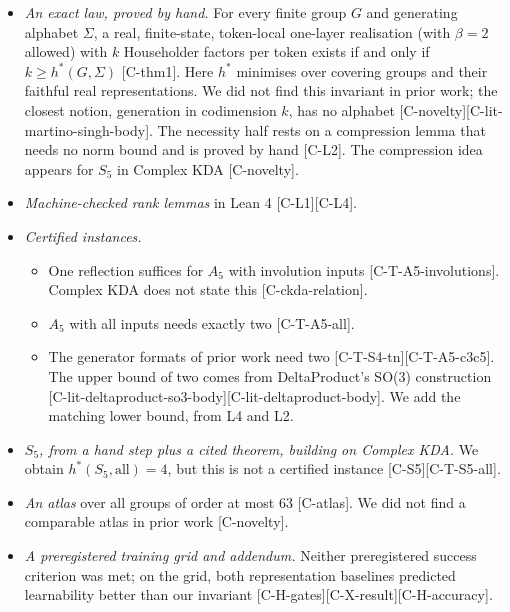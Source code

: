 \documentclass[10pt,twocolumn,a4paper]{article}
\providecommand{\tightlist}{\setlength{\itemsep}{0pt}\setlength{\parskip}{0pt}}
\begin{document}
\begin{itemize}
\tightlist
\item
  \emph{An exact law, proved by hand.} For every finite group \(G\) and generating alphabet \(\Sigma\), a real, finite-state, token-local one-layer realisation (with \(\beta = 2\) allowed) with \(k\) Householder factors per token exists if and only if \(k \ge h^*(G,\Sigma)\) {[}C-thm1{]}. Here \(h^*\) minimises over covering groups and their faithful real representations. We did not find this invariant in prior work; the closest notion, generation in codimension \(k\), has no alphabet {[}C-novelty{]}{[}C-lit-martino-singh-body{]}. The necessity half rests on a compression lemma that needs no norm bound and is proved by hand {[}C-L2{]}. The compression idea appears for \(S_5\) in Complex KDA {[}C-novelty{]}.
\item
  \emph{Machine-checked rank lemmas} in Lean 4 {[}C-L1{]}{[}C-L4{]}.
\item
  \emph{Certified instances.}

  \begin{itemize}
  \tightlist
  \item
    One reflection suffices for \(A_5\) with involution inputs {[}C-T-A5-involutions{]}. Complex KDA does not state this {[}C-ckda-relation{]}.
  \item
    \(A_5\) with all inputs needs exactly two {[}C-T-A5-all{]}.
  \item
    The generator formats of prior work need two {[}C-T-S4-tn{]}{[}C-T-A5-c3c5{]}. The upper bound of two comes from DeltaProduct's SO(3) construction {[}C-lit-deltaproduct-so3-body{]}{[}C-lit-deltaproduct-body{]}. We add the matching lower bound, from L4 and L2.
  \end{itemize}
\item
  \emph{\(S_5\), from a hand step plus a cited theorem, building on Complex KDA.} We obtain \(h^*(S_5,\text{all}) = 4\), but this is not a certified instance {[}C-S5{]}{[}C-T-S5-all{]}.
\item
  \emph{An atlas} over all groups of order at most 63 {[}C-atlas{]}. We did not find a comparable atlas in prior work {[}C-novelty{]}.
\item
  \emph{A preregistered training grid and addendum.} Neither preregistered success criterion was met; on the grid, both representation baselines predicted learnability better than our invariant {[}C-H-gates{]}{[}C-X-result{]}{[}C-H-accuracy{]}.
\end{itemize}
\end{document}
